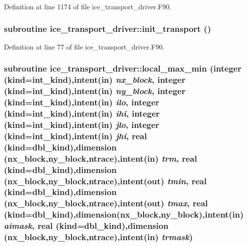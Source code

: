 Definition at line 1174 of file ice\_\-transport\_\-driver.F90.\hypertarget{namespaceice__transport__driver_a47d0afada16dff37da3f72fa4c27ef86}{
\subsubsection[{init\_\-transport}]{\setlength{\rightskip}{0pt plus 5cm}subroutine ice\_\-transport\_\-driver::init\_\-transport ()}}
\label{namespaceice__transport__driver_a47d0afada16dff37da3f72fa4c27ef86}


Definition at line 77 of file ice\_\-transport\_\-driver.F90.\hypertarget{namespaceice__transport__driver_a1454e3a5f9bdaec16216269fabe0c5b4}{
\subsubsection[{local\_\-max\_\-min}]{\setlength{\rightskip}{0pt plus 5cm}subroutine ice\_\-transport\_\-driver::local\_\-max\_\-min (integer (kind=int\_\-kind),intent(in) {\em nx\_\-block}, \/  integer (kind=int\_\-kind),intent(in) {\em ny\_\-block}, \/  integer (kind=int\_\-kind),intent(in) {\em ilo}, \/  integer (kind=int\_\-kind),intent(in) {\em ihi}, \/  integer (kind=int\_\-kind),intent(in) {\em jlo}, \/  integer (kind=int\_\-kind),intent(in) {\em jhi}, \/  real (kind=dbl\_\-kind),dimension (nx\_\-block,ny\_\-block,ntrace),intent(in) {\em trm}, \/  real (kind=dbl\_\-kind),dimension (nx\_\-block,ny\_\-block,ntrace),intent(out) {\em tmin}, \/  real (kind=dbl\_\-kind),dimension (nx\_\-block,ny\_\-block,ntrace),intent(out) {\em tmax}, \/  real (kind=dbl\_\-kind),dimension(nx\_\-block,ny\_\-block),intent(in) {\em aimask}, \/  real (kind=dbl\_\-kind),dimension (nx\_\-block,ny\_\-block,ntrace),intent(in) {\em trmask})}}
\label{namespaceice__transport__driver_a1454e3a5f9bdaec16216269fabe0c5b4}


